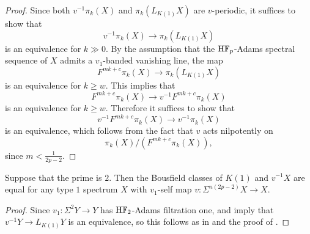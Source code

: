 \begin{proof}
    Since both $v^{-1} \pi_k (X)$ and $\pi_k (L_{K(1)} X)$ are $v$-periodic, it suffices to show that \[v^{-1} \pi_k (X) \to \pi_k (L_{K(1)} X)\] is an equivalence for $k \gg 0$. By the assumption that the $\mathrm{H}\mathbb{F}_p$-Adams spectral sequence of $X$ admits a $v_1$-banded vanishing line, the map \[F^{mk +c} \pi_k (X) \to \pi_k (L_{K(1)} X)\] is an equivalence for $k \geq w$.
    This implies that \[F^{mk +c} \pi_k (X) \to v^{-1} F^{mk +c} \pi_k (X)\] is an equivalence for $k \geq w$. Therefore it suffices to show that \[v^{-1} F^{mk+c} \pi_k (X) \to v^{-1} \pi_k (X)\] is an equivalence, which follows from the fact that $v$ acts nilpotently on \[\pi_k(X) / (F^{mk+c} \pi_k (X)),\] since $m < \frac{1}{2p-2}$.
\end{proof}


\begin{cor} \label{cor:telescope}
	Suppose that the prime is $2$. Then the Bousfield classes of $K(1)$ and $v^{-1} X$ are equal for any type $1$ spectrum $X$ with $v_1$-self map $v : \Sigma^{n(2p-2)} X \to X$.
\end{cor}

\begin{proof}
    Since $v_1 : \Sigma^2 Y \to Y$ has $\mathrm{H}\mathbb{F}_2$-Adams filtration one,  and  imply that $v ^{-1} Y \to L_{K(1)} Y$ is an equivalence, so this follows as in \cite[Section 4]{BousfieldLocalization} and the proof of \cite[Theorem 10.12]{RavenelConjs}.
\end{proof}

